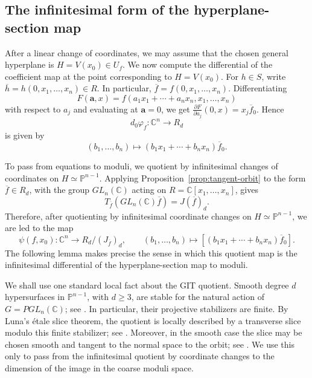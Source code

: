 \documentclass[11pt]{amsart}
\theoremstyle{plain}
\theoremstyle{definition}
\numberwithin{equation}{section}
\newcommand{\C}{\mathbb{C}}
\newcommand{\PP}{\mathbb{P}}
\begin{document}
\subsection{The infinitesimal form of the hyperplane-section map} \label{subsec:infinitesimal-hyperplane-map}
After a linear change of coordinates, we may assume that the chosen general
hyperplane is $H=V(x_0)\in U_f$.
We now compute the differential of the coefficient map at the point corresponding
to $H=V(x_0)$. For $h\in S$, write
$\overline h=h(0,x_1,\ldots,x_n)\in R$.
In particular, $\overline f=f(0,x_1,\ldots,x_n)$. Differentiating
\[
F(\mathbf a,x)=f(a_1x_1+\cdots+a_nx_n,x_1,\ldots,x_n)
\]
with respect to $a_j$ and evaluating at $\mathbf a=0$, we get
$\frac{\partial F}{\partial a_j}(0,x)=x_j\overline f_0$.
Hence
\[
d_0\varphi_f:\C^n\longrightarrow R_d
\]
is given by
\[
(b_1,\ldots,b_n)\longmapsto
(b_1x_1+\cdots+b_nx_n)\overline f_0.
\]

To pass from equations to moduli, we quotient by infinitesimal changes of
coordinates on $H\simeq \PP^{n-1}$. Applying Proposition~\ref{prop:tangent-orbit}
to the form $\overline f\in R_d$, with the group $GL_n(\C)$ acting on
$R=\C[x_1,\ldots,x_n]$, gives
\[
T_{\overline f}(GL_n(\C)\overline f)=J(\overline f)_d.
\]
Therefore, after quotienting by infinitesimal coordinate changes on
$H\simeq\PP^{n-1}$, we are led to the map
\begin{equation}
\label{eq:psi-local}
\psi(f,x_0):\C^n\to R_d/(J_{\overline f})_d,\qquad
(b_1,\ldots,b_n)\mapsto
\left[(b_1x_1+\cdots+b_nx_n)\overline f_0\right].
\end{equation}
The following lemma makes precise the sense in which this quotient map is the
infinitesimal differential of the hyperplane-section map to moduli.

We shall use one standard local fact about the GIT quotient. Smooth degree $d$
hypersurfaces in $\PP^{n-1}$, with $d\geq3$, are stable for the natural action
of $G=PGL_n(\C)$; see \cite[Chapter~4, \S2]{MFK}. In particular, their
projective stabilizers are finite. By Luna's \'{e}tale slice theorem, the
quotient is locally described by a transverse slice modulo this finite
stabilizer; see
\cite[Chapitre~III, \S1, Th\'eor\`eme du slice \'etale, p.~97]{Luna}.
Moreover, in the smooth case the slice may be chosen smooth and tangent to the
normal space to the orbit; see
\cite[Chapitre~III, \S1, Remarque~1$^\circ$ following the theorem, p.~97]{Luna}.
We use this only to pass from the infinitesimal quotient by coordinate changes
to the dimension of the image in the coarse moduli space.
\end{document}
